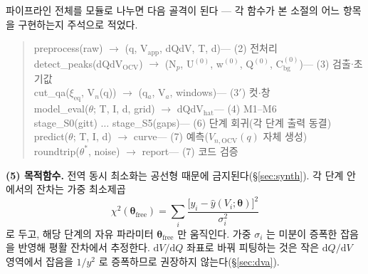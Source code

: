 \documentclass[11pt,a4paper]{article}
\newcommand{\dd}{\mathrm{d}}
\begin{document}
파이프라인 전체를 모듈로 나누면 다음 골격이 된다 — 각 함수가 본 소절의 어느 항목을 구현하는지 주석으로
적었다.
\begin{quote}\ttfamily\footnotesize
preprocess(raw) $\to$ (q, V$_{\mathrm{app}}$, dQdV, T, d)\quad\rmfamily — (2) 전처리\\
\ttfamily detect\_peaks(dQdV$_{\mathrm{OCV}}$) $\to$ (N$_p$, U$^{(0)}$, w$^{(0)}$, Q$^{(0)}$,
C$_{\mathrm{bg}}^{(0)}$)\quad\rmfamily — (3) 검출$\cdot$초기값\\
\ttfamily cut\_qa($\xi_{\mathrm{eq}}$, V$_n$(q)) $\to$ (q$_a$, V$_a$, windows)\quad\rmfamily — (3$'$) 컷$\cdot$창\\
\ttfamily model\_eval($\theta$; T, I, d, grid) $\to$ dQdV$_{\mathrm{hat}}$\quad\rmfamily — (4) M1--M6\\
\ttfamily stage\_S0(gitt) $\dots$ stage\_S5(gaps)\quad\rmfamily — (6) 단계 회귀(각 단계 출력 동결)\\
\ttfamily predict($\theta$; T, I, d) $\to$ curve\quad\rmfamily — (7) 예측($V_{n,\mathrm{OCV}}(q)$ 자체 생성)\\
\ttfamily roundtrip($\theta^\ast$, noise) $\to$ report\quad\rmfamily — (7) 코드 검증
\end{quote}

\textbf{(5) 목적함수.} 전역 동시 최소화는 공선형 때문에 금지된다(\S\ref{sec:synth}). 각 단계 안에서의 잔차는
가중 최소제곱
\begin{equation*}
\chi^2(\bm\theta_{\text{free}})=\sum_i\frac{\big[y_i-\widehat y(V_i;\bm\theta)\big]^2}{\sigma_i^2}
\end{equation*}
로 두고, 해당 단계의 자유 파라미터 $\bm\theta_{\text{free}}$ 만 움직인다. 가중 $\sigma_i$ 는 미분이 증폭한
잡음을 반영해 평활 잔차에서 추정한다. $\dd V/\dd Q$ 좌표로 바꿔 피팅하는 것은 작은 $\dd Q/\dd V$ 영역에서
잡음을 $1/y^2$ 로 증폭하므로 권장하지 않는다(\S\ref{sec:dva}).
\end{document}
